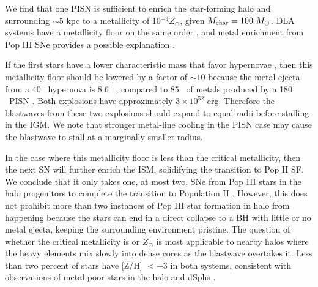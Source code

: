 \documentclass[apjl]{emulateapj}
\begin{document}
We find that one PISN is sufficient to enrich the star-forming halo
and surrounding $\sim 5$ kpc to a metallicity of 10$^{-3} Z_\odot$,
given $M_{\rm char} = 100~\Ms$.  DLA systems have a metallicity floor
on the same order \citep{Wolfe05_Review}, and metal enrichment from Pop
III SNe provides a possible explanation \citep{Kobayashi11}.

If the first stars have a lower characteristic mass that favor
hypernovae \citep{Tumlinson07_IMF}, then this metallicity floor should
be lowered by a factor of $\sim 10$ because the metal ejecta from a 40
\Ms~hypernova is 8.6 \Ms~\citep{Nomoto06}, compared to 85 \Ms~of
metals produced by a 180 \Ms~PISN \citep{Heger02}.  Both explosions
have approximately $3 \times 10^{52}$ erg.  Therefore the blastwaves
from these two explosions should expand to equal radii before stalling
in the IGM.  We note that stronger metal-line cooling in the PISN case
may cause the blastwave to stall at a marginally smaller radius.  

In the case where this metallicity floor is less than the critical
metallicity, then the next SN will further enrich the ISM, solidifying
the transition to Pop II SF.  We conclude that it only takes one, at
most two, SNe from Pop III stars in the halo progenitors to complete
the transition to Population II \citep{Frebel10}.  However, this does
not prohibit more than two instances of Pop III star formation in halo
from happening because the stars can end in a direct collapse to a BH
with little or no metal ejecta, keeping the surrounding environment
pristine.  The question of whether the critical metallicity is
 or  $Z_\odot$ is most applicable to nearby
halos where the heavy elements mix slowly into dense cores as the
blastwave overtakes it.  Less than two percent of stars have [Z/H] $<
-3$ in both systems, consistent with observations of metal-poor stars
in the halo and dSphs \citep{Beers05, Battaglia10}.

\end{document}
